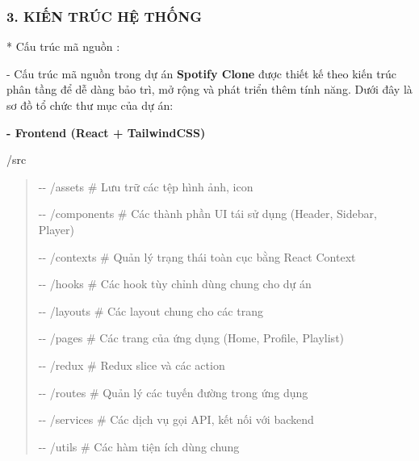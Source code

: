 \documentclass{article}
\begin{document}
\subsubsection{}\label{section-9}

\subsubsection{}\label{section-10}

\subsubsection{}\label{section-11}

\subsubsection{\texorpdfstring{\textbf{3. KIẾN TRÚC HỆ
THỐNG}}{3. KIẾN TRÚC HỆ THỐNG}}\label{kiux1ebfn-truxfac-hux1ec7-thux1ed1ng}

* Cấu trúc mã nguồn :

- Cấu trúc mã nguồn trong dự án \textbf{Spotify Clone} được thiết kế
theo kiến trúc phân tầng để dễ dàng bảo trì, mở rộng và phát triển thêm
tính năng. Dưới đây là sơ đồ tổ chức thư mục của dự án:

\textbf{- Frontend (React + TailwindCSS)}

/src

\begin{quote}
\textbar-\/- /assets \# Lưu trữ các tệp hình ảnh, icon

\textbar-\/- /components \# Các thành phần UI tái sử dụng (Header,
Sidebar, Player)

\textbar-\/- /contexts \# Quản lý trạng thái toàn cục bằng React Context

\textbar-\/- /hooks \# Các hook tùy chỉnh dùng chung cho dự án

\textbar-\/- /layouts \# Các layout chung cho các trang

\textbar-\/- /pages \# Các trang của ứng dụng (Home, Profile, Playlist)

\textbar-\/- /redux \# Redux slice và các action

\textbar-\/- /routes \# Quản lý các tuyến đường trong ứng dụng

\textbar-\/- /services \# Các dịch vụ gọi API, kết nối với backend

\textbar-\/- /utils \# Các hàm tiện ích dùng chung
\end{quote}
\end{document}
